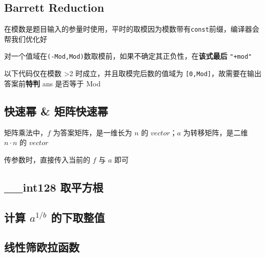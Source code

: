 \documentclass[12pt]{article}
\begin{document}


\subsection{Barrett Reduction}

在模数是题目输入的参量时使用，平时的取模因为模数带有\texttt{const}前缀，编译器会帮我们优化好

对一个值域在\texttt{(-Mod,Mod)}数取模前，如果不确定其正负性，在\textbf{该式最后} \texttt{"+mod"}

以下代码仅在模数 >2 时成立，并且取模完后数的值域为 \texttt{[0,Mod]}，故需要在输出答案前\textbf{特判} ans 是否等于 Mod



\newpage

\subsection{快速幂 \& 矩阵快速幂}

矩阵乘法中，$f$ 为答案矩阵，是一维长为 $n$ 的 $vector$；$a$ 为转移矩阵，是二维 $n\cdot n$ 的 $vector$

传参数时，直接传入当前的 $f$ 与 $a$ 即可



\newpage

\subsection{\_{}\_{}int128 取平方根}



\newpage

\subsection{计算 $a^{1/b}$ 的下取整值}



\subsection{线性筛欧拉函数}


\end{document}
